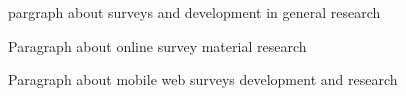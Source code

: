 pargraph about surveys and development in general research

Paragraph about online survey material research

Paragraph about mobile web surveys development and research
